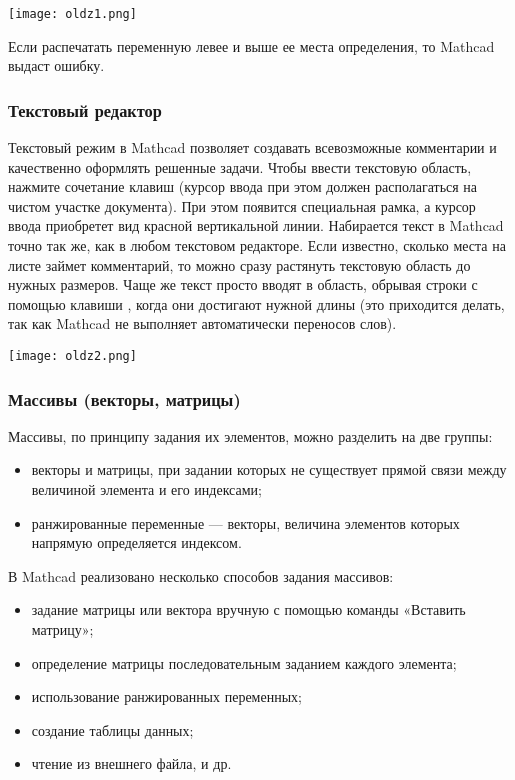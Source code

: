 	\begin{center}
		\texttt{[image: oldz1.png]}
	\end{center}

Если распечатать переменную  левее и выше ее места определения, то Mathcad выдаст ошибку.

\subsubsection*{Текстовый редактор}
Текстовый режим в Mathcad позволяет создавать всевозможные комментарии и качественно оформлять решенные задачи.
Чтобы ввести текстовую область, нажмите сочетание клавиш  (курсор ввода при этом должен располагаться на чистом участке документа). При этом появится специальная рамка, а курсор ввода приобретет вид красной вертикальной линии.
Набирается текст в Mathcad точно так же, как в любом текстовом редакторе. Если известно, сколько места на листе займет комментарий, то можно сразу растянуть текстовую область до нужных размеров. Чаще же текст просто вводят в область, обрывая строки с помощью клавиши \keys{\enter}, когда они достигают нужной длины (это приходится делать, так как Mathcad не выполняет автоматически переносов слов).

\begin{center}
	\texttt{[image: oldz2.png]}
\end{center}


\subsubsection{Массивы (векторы, матрицы)}
Массивы, по принципу задания их элементов, можно разделить на две группы:
\begin{itemize}
	\item векторы и матрицы, при задании которых не существует прямой связи между величиной элемента и его индексами;
	\item ранжированные переменные --- векторы, величина элементов которых напрямую определяется индексом.
\end{itemize}
В Mathcad реализовано несколько способов задания массивов:
\begin{itemize}
	\item задание матрицы или вектора вручную с помощью команды «Вставить матрицу»;
	\item определение матрицы последовательным заданием каждого элемента;
	\item  использование ранжированных переменных;
	\item создание таблицы данных;
	\item чтение из внешнего файла, и др.
\end{itemize}

